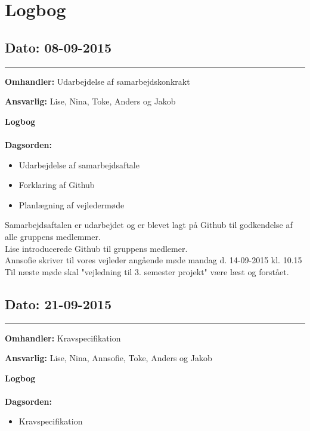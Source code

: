 \chapter{Logbog}

\section{Dato: 08-09-2015 }
\hrule

\textbf{Omhandler:} Udarbejdelse af samarbejdskonkrakt 

\textbf{Ansvarlig:} Lise, Nina, Toke, Anders og Jakob

\textbf{Logbog}
\\
\\
\textbf{Dagsorden:}
\begin{itemize}
	\item Udarbejdelse af samarbejdsaftale
	\item Forklaring af Github
	\item Planlægning af vejledermøde
\end{itemize}

Samarbejdsaftalen er udarbejdet og er blevet lagt på Github til godkendelse af alle gruppens medlemmer.\\
Lise introducerede Github til gruppens medlemer.\\
Annsofie skriver til vores vejleder angående møde mandag d. 14-09-2015 kl. 10.15\\
Til næste møde skal "vejledning til 3. semester projekt" være læst og forstået.\\
	



\section{Dato: 21-09-2015 }
\hrule

\textbf{Omhandler:} Kravspecifikation

\textbf{Ansvarlig:} Lise, Nina, Annsofie, Toke, Anders og Jakob

\textbf{Logbog}
\\
\\
\textbf{Dagsorden:}
\begin{itemize}
	\item Kravspecifikation
\end{itemize}

